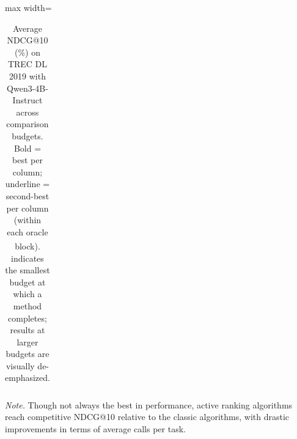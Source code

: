 \documentclass{llmxive}
\begin{document}
\begin{table}[!hbp]
\begin{adjustbox}{max width=\textwidth}
\begin{tabular}{c l rrrrrrrrr}
\bottomrule
\end{tabular}%
\end{adjustbox}
\caption{Average NDCG@10 (\%) on TREC DL 2019 with Qwen3-4B-Instruct across comparison budgets. Bold = best per column; underline = second-best per column (within each oracle block). \textsuperscript{\textdagger} indicates the smallest budget at which a method completes; results at larger budgets are visually de-emphasized.}
\label{tab:budget_ndcg10_oracles_qwen3_4b_dl2019}
\par\vspace{2pt}\footnotesize\noindent\textit{Note.} Though not always the best in performance, active ranking algorithms reach competitive NDCG@10 relative to the classic algorithms, with drastic improvements in terms of average calls per task.


\end{table}
\end{document}
